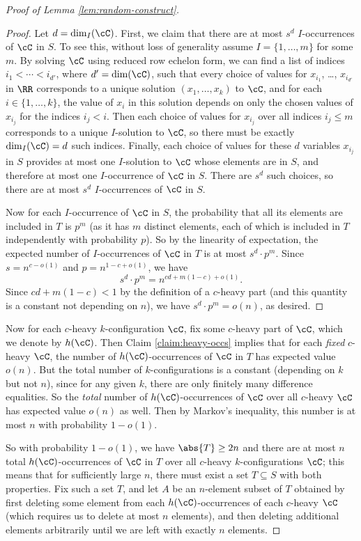 \begin{proof}[Proof of Lemma \ref{lem:random-construct}]
    \begin{proof}
        Let $d = \dim_I(\cC)$. First, we claim that there are at most $s^d$ $I$-occurrences of $\cC$ in $S$. To see this, without loss of generality assume $I = \{1, \ldots, m\}$ for some $m$. By solving $\cC$ using reduced row echelon form, we can find a list of indices $i_1 < \cdots < i_{d'}$, where $d' = \dim(\cC)$, such that every choice of values for $x_{i_1}$, \ldots, $x_{i_{d'}}$ in $\RR$ corresponds to a unique solution $(x_1, \ldots, x_k)$ to $\cC$, and for each $i \in \{1, \ldots, k\}$, the value of $x_i$ in this solution depends on only the chosen values of $x_{i_j}$ for the indices $i_j < i$. Then each choice of values for $x_{i_j}$ over all indices $i_j \leq m$ corresponds to a unique $I$-solution to $\cC$, so there must be exactly $\dim_I(\cC) = d$ such indices. Finally, each choice of values for these $d$ variables $x_{i_j}$ in $S$ provides at most one $I$-solution to $\cC$ whose elements are in $S$, and therefore at most one $I$-occurrence of $\cC$ in $S$. There are $s^d$ such choices, so there are at most $s^d$ $I$-occurrences of $\cC$ in $S$. 

        Now for each $I$-occurrence of $\cC$ in $S$, the probability that all its elements are included in $T$ is $p^m$ (as it has $m$ distinct elements, each of which is included in $T$ independently with probability $p$). So by the linearity of expectation, the expected number of $I$-occurrences of $\cC$ in $T$ is at most $s^d \cdot p^m$. Since $s = n^{c - o(1)}$ and $p = n^{1 - c + o(1)}$, we have \[s^d \cdot p^m = n^{cd + m(1 - c) + o(1)}.\] Since $cd + m(1 - c) < 1$ by the definition of a $c$-heavy part (and this quantity is a constant not depending on $n$), we have $s^d \cdot p^m = o(n)$, as desired. 
    \end{proof}

    Now for each $c$-heavy $k$-configuration $\cC$, fix some $c$-heavy part of $\cC$, which we denote by $h(\cC)$. Then Claim \ref{claim:heavy-occs} implies that for each \emph{fixed} $c$-heavy $\cC$, the number of $h(\cC)$-occurrences of $\cC$ in $T$ has expected value $o(n)$. But the total number of $k$-configurations is a constant (depending on $k$ but not $n$), since for any given $k$, there are only finitely many difference equalities. So the \emph{total} number of $h(\cC)$-occurrences of $\cC$ over all $c$-heavy $\cC$ has expected value $o(n)$ as well. Then by Markov's inequality, this number is at most $n$ with probability $1 - o(1)$. 

    So with probability $1 - o(1)$, we have $\abs{T} \geq 2n$ and there are at most $n$ total $h(\cC)$-occurrences of $\cC$ in $T$ over all $c$-heavy $k$-configurations $\cC$; this means that for sufficiently large $n$, there must exist a set $T \subseteq S$ with both properties. Fix such a set $T$, and let $A$ be an $n$-element subset of $T$ obtained by first deleting some element from each $h(\cC)$-occurrences of each $c$-heavy $\cC$ (which requires us to delete at most $n$ elements), and then deleting additional elements arbitrarily until we are left with exactly $n$ elements. 


\end{proof}

